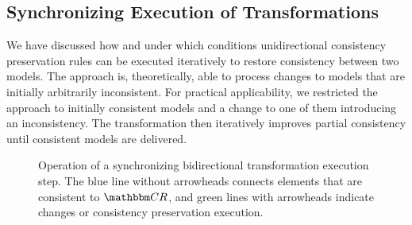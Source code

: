 


\subsection{Synchronizing Execution of Transformations}
\label{chap:synchronization:bidirectional:execution}

We have discussed how and under which conditions unidirectional consistency preservation rules can be executed iteratively to restore consistency between two models.
The approach is, theoretically, able to process changes to models that are initially arbitrarily inconsistent.
For practical applicability, we restricted the approach to initially consistent models and a change to one of them introducing an inconsistency.
The transformation then iteratively improves partial consistency until consistent models are delivered.

\begin{figure}
    \centering
    
    \caption[Synchronizing bidirectional transformation execution step]{Operation of a synchronizing bidirectional transformation execution step.
    The blue line without arrowheads connects elements that are consistent to $\consistencyrelationset{CR}$, and green lines with arrowheads indicate changes or consistency preservation execution.
    }
    \label{fig:synchronization:synchronizing_execution_step}
\end{figure}

